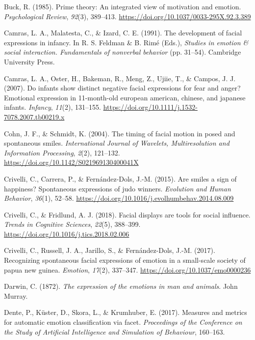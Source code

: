 \documentclass[
  english,
  man]{apa7}
\newlength{\cslhangindent}
\newenvironment{cslreferences}%
  {\setlength{\parindent}{0pt}%
  \everypar{\setlength{\hangindent}{\cslhangindent}}\ignorespaces}%
  {\par}
\begin{document}
\begin{cslreferences}
\leavevmode\hypertarget{ref-buck1985prime}{}%
Buck, R. (1985). Prime theory: An integrated view of motivation and emotion. \emph{Psychological Review}, \emph{92}(3), 389--413. \url{https://doi.org/10.1037/0033-295X.92.3.389}

\leavevmode\hypertarget{ref-camras1991development}{}%
Camras, L. A., Malatesta, C., \& Izard, C. E. (1991). The development of facial expressions in infancy. In R. S. Feldman \& B. Rimé (Eds.), \emph{Studies in emotion \& social interaction. Fundamentals of nonverbal behavior} (pp. 31--54). Cambridge University Press.

\leavevmode\hypertarget{ref-camras2007infants}{}%
Camras, L. A., Oster, H., Bakeman, R., Meng, Z., Ujiie, T., \& Campos, J. J. (2007). Do infants show distinct negative facial expressions for fear and anger? Emotional expression in 11-month-old european american, chinese, and japanese infants. \emph{Infancy}, \emph{11}(2), 131--155. \url{https://doi.org/10.1111/j.1532-7078.2007.tb00219.x}

\leavevmode\hypertarget{ref-cohn2003timing}{}%
Cohn, J. F., \& Schmidt, K. (2004). The timing of facial motion in posed and spontaneous smiles. \emph{International Journal of Wavelets, Multiresolution and Information Processing}, \emph{2}(2), 121--132. \url{https://doi.org/10.1142/S021969130400041X}

\leavevmode\hypertarget{ref-crivelli2015smiles}{}%
Crivelli, C., Carrera, P., \& Fernández-Dols, J.-M. (2015). Are smiles a sign of happiness? Spontaneous expressions of judo winners. \emph{Evolution and Human Behavior}, \emph{36}(1), 52--58. \url{https://doi.org/10.1016/j.evolhumbehav.2014.08.009}

\leavevmode\hypertarget{ref-crivelli2018facial}{}%
Crivelli, C., \& Fridlund, A. J. (2018). Facial displays are tools for social influence. \emph{Trends in Cognitive Sciences}, \emph{22}(5), 388--399. \url{https://doi.org/10.1016/j.tics.2018.02.006}

\leavevmode\hypertarget{ref-crivelli2017recognizing}{}%
Crivelli, C., Russell, J. A., Jarillo, S., \& Fernández-Dols, J.-M. (2017). Recognizing spontaneous facial expressions of emotion in a small-scale society of papua new guinea. \emph{Emotion}, \emph{17}(2), 337--347. \url{https://doi.org/10.1037/emo0000236}

\leavevmode\hypertarget{ref-darwin1872expression}{}%
Darwin, C. (1872). \emph{The expression of the emotions in man and animals}. John Murray.

\leavevmode\hypertarget{ref-dente2017measures}{}%
Dente, P., Küster, D., Skora, L., \& Krumhuber, E. (2017). Measures and metrics for automatic emotion classification via facet. \emph{Proceedings of the Conference on the Study of Artificial Intelligence and Simulation of Behaviour}, 160--163.


\end{cslreferences}
\end{document}
